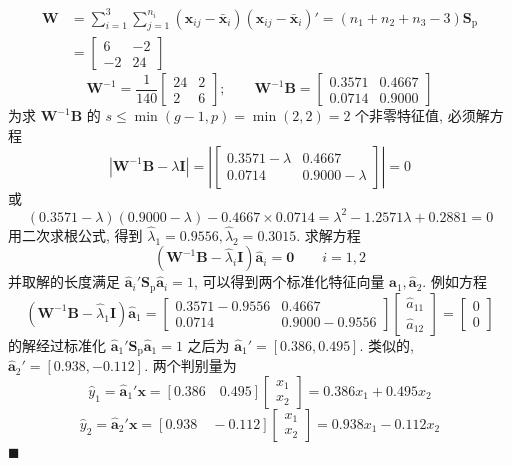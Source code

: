 
\[
\begin{aligned}
\mathbf{W}&=\sum_{i=1}^{3}\sum_{j=1}^{n_i}(\mathbf{x}_{ij}-\bar{\mathbf{x}}_i)(\mathbf{x}_{ij}-\bar{\mathbf{x}}_i)'=(n_1+n_2+n_3-3)\mathbf{S}_{\mathrm{p}}\\
&=\begin{bmatrix}6&-2\\-2&24\end{bmatrix}
\end{aligned}
\]
\[
\mathbf{W}^{-1}=\frac{1}{140}\begin{bmatrix}24&2\\2&6\end{bmatrix};\qquad
\mathbf{W}^{-1}\mathbf{B}=\begin{bmatrix}0.3571&0.4667\\0.0714&0.9000\end{bmatrix}
\]
为求 $\mathbf{W}^{-1}\mathbf{B}$ 的 $s\le\min(g-1,p)=\min(2,2)=2$ 个非零特征值, 必须解方程
\[
\left|\mathbf{W}^{-1}\mathbf{B}-\lambda\mathbf{I}\right|=\left|\begin{bmatrix}0.3571-\lambda&0.4667\\0.0714&0.9000-\lambda\end{bmatrix}\right|=0
\]
或
\[
(0.3571-\lambda)(0.9000-\lambda)-0.4667\times 0.0714=\lambda^2-1.2571\lambda+0.2881=0
\]
用二次求根公式, 得到 $\hat{\lambda}_1=0.9556,\hat{\lambda}_2=0.3015$. 求解方程
\[
(\mathbf{W}^{-1}\mathbf{B}-\hat{\lambda}_i\mathbf{I})\hat{\mathbf{a}}_i=\mathbf{0}\qquad i=1,2
\]
并取解的长度满足 $\hat{\mathbf{a}}_i'\mathbf{S}_{\mathrm{p}}\hat{\mathbf{a}}_i=1$, 可以得到两个标准化特征向量 $\hat{\mathbf{a}}_1,\hat{\mathbf{a}}_2$. 例如方程
\[
(\mathbf{W}^{-1}\mathbf{B}-\hat{\lambda}_1\mathbf{I})\hat{\mathbf{a}}_1=\begin{bmatrix}0.3571-0.9556&0.4667\\0.0714&0.9000-0.9556\end{bmatrix}\begin{bmatrix}\hat{a}_{11}\\\hat{a}_{12}\end{bmatrix}=\begin{bmatrix}0\\0\end{bmatrix}
\]
的解经过标准化 $\hat{\mathbf{a}}_1'\mathbf{S}_{\mathrm{p}}\hat{\mathbf{a}}_1=1$ 之后为 $\hat{\mathbf{a}}_1'=[0.386,0.495]$. 类似的, $\hat{\mathbf{a}}_2'=[0.938,-0.112]$. 两个判别量为
\[
\hat{y}_1=\hat{\mathbf{a}}_1'\mathbf{x}=[0.386\quad 0.495]\begin{bmatrix}x_1\\x_2\end{bmatrix}=0.386x_1+0.495x_2
\]
\[
\hat{y}_2=\hat{\mathbf{a}}_2'\mathbf{x}=[0.938\quad -0.112]\begin{bmatrix}x_1\\x_2\end{bmatrix}=0.938x_1-0.112x_2
\]
\hfill$\blacksquare$

